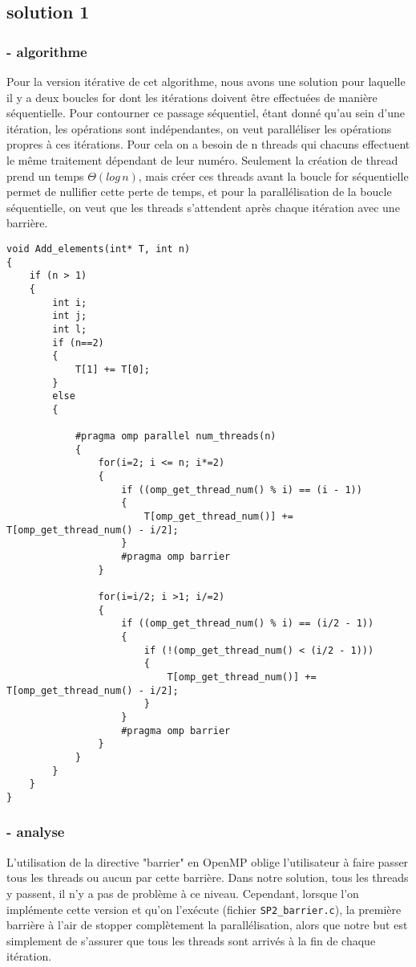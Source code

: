 \subsection*{solution 1}
\subsubsection*{- algorithme}

Pour la version itérative de cet algorithme, nous avons une solution pour laquelle il y a deux boucles for dont les itérations doivent être effectuées de manière séquentielle. Pour contourner ce passage séquentiel, étant donné qu'au sein d'une itération, les opérations sont indépendantes, on veut paralléliser les opérations propres à ces itérations. Pour cela on a besoin de n threads qui chacuns effectuent le même traitement dépendant de leur numéro. Seulement la création de thread prend un temps $\Theta (log \, n)$, mais créer ces threads avant la boucle for séquentielle permet de nullifier cette perte de temps, et pour la parallélisation de la boucle séquentielle, on veut que les threads s'attendent après chaque itération avec une barrière.

\begin{lstlisting}[mathescape, style=cilk, title=Algorithme parallèle avec OpenMP de \textit{prefix-sum}.]
void Add_elements(int* T, int n)
{
	if (n > 1)
	{
		int i;
		int j;
		int l;
		if (n==2)
		{
			T[1] += T[0];
		}
		else
		{

			#pragma omp parallel num_threads(n)
			{
				for(i=2; i <= n; i*=2)
				{
					if ((omp_get_thread_num() % i) == (i - 1))
					{
						T[omp_get_thread_num()] += T[omp_get_thread_num() - i/2];
					}
					#pragma omp barrier
				}
					
				for(i=i/2; i >1; i/=2)
				{
					if ((omp_get_thread_num() % i) == (i/2 - 1))
					{
						if (!(omp_get_thread_num() < (i/2 - 1)))
						{
							T[omp_get_thread_num()] += T[omp_get_thread_num() - i/2];
						}
					}
					#pragma omp barrier
				}
			}
		}
	}
}

\end{lstlisting}

\subsubsection*{- analyse}
L'utilisation de la directive "barrier" en OpenMP oblige l'utilisateur à faire passer tous les threads ou aucun par cette barrière. Dans notre solution, tous les threads y passent, il n'y a pas de problème à ce niveau. Cependant, lorsque l'on implémente cette version et qu'on l'exécute (fichier \verb+SP2_barrier.c+), la première barrière à l'air de stopper complètement la parallélisation, alors que notre but est simplement de s'assurer que tous les threads sont arrivés à la fin de chaque itération.

